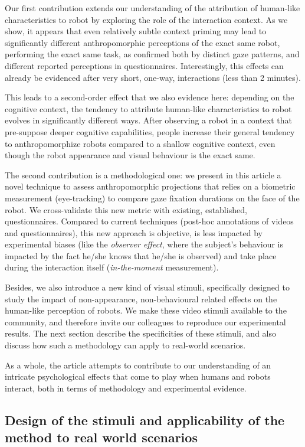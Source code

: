\documentclass[lettersize, noapacite, twoside, HRI]{apa_HRI}
\begin{document}
Our first contribution extends our understanding of the attribution of
human-like characteristics to robot by exploring the role of the interaction
context. As we show, it appears that even relatively subtle context
priming may lead to significantly different anthropomorphic perceptions of
the exact same robot, performing the exact same task, as confirmed both by
distinct gaze patterns, and different reported perceptions in questionnaires.
Interestingly, this effects can already be evidenced after very short,
one-way, interactions (less than 2 minutes).

This leads to a second-order effect that we also evidence here: depending on the
cognitive context, the tendency to attribute human-like characteristics to robot
evolves in significantly different ways. After observing a robot in a
context that pre-suppose deeper cognitive capabilities, people increase
their general tendency to anthropomorphize robots compared to a shallow
cognitive context, even though the robot appearance and visual behaviour is the
exact same.

The second contribution is a methodological one: we present in this article
a novel technique to assess anthropomorphic projections that relies on a
biometric measurement (eye-tracking) to compare gaze fixation durations on
the face of the robot. We cross-validate this new metric with existing,
established, questionnaires. Compared to current techniques (post-hoc
annotations of videos and questionnaires), this new approach is objective,
is less impacted by experimental biases (like the \emph{observer effect},
where the subject's behaviour is impacted by the fact he/she knows that
he/she is observed) and take place during the interaction itself
(\emph{in-the-moment} measurement).

Besides, we also introduce a new kind of visual stimuli, specifically designed
to study the impact of non-appearance, non-behavioural related effects on the
human-like perception of robots. We make these video stimuli available to the
community, and therefore invite our colleagues to reproduce our experimental
results. The next section describe the specificities of these stimuli, and also
discuss how such a methodology can apply to real-world scenarios.

As a whole, the article attempts to contribute to our understanding of an
intricate psychological effects that come to play when humans and robots
interact, both in terms of methodology and experimental evidence.

\subsection{Design of the stimuli and applicability of the method to real world
scenarios}
\label{stimuli_design}
\end{document}
